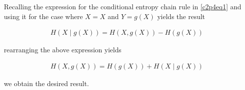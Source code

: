 \documentclass[ClusteringConnectionsMAIN.tex]{subfiles}
\begin{document}
	

  Recalling the expression for the conditional entropy chain rule in \ref{c2p4eq1} and using it for the case where $X = X$ and $Y = g \left( X \right)$ yields the result

\begin{align*} 
H \left( X \mid g \left( X \right) \right) = H \left( X, g \left( X \right) \right) - H \left( g \left( X \right) \right)  
\end{align*}

\newpage

rearranging the above expression yields 

\begin{align} \label{c2p4eq3}
H \left( X, g \left( X \right) \right) = H \left( g \left( X \right) \right) + H \left( X \mid g \left( X \right) \right)  \tag{2.4-3}
\end{align}

we obtain the desired result.
\end{document}
